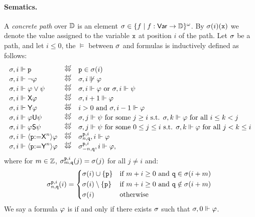\paragraph{Sematics.} A \emph{concrete path} over $\mathbb{D}$ is an element $\sigma\in\{f\mid f:{\rm \sf Var}\to\mathbb{D}\}^\omega$. By $\sigma(i)(\mathtt{x})$ we denote the value assigned to the variable $\mathtt{x}$ at position $i$ of the path.
Let $\sigma$ be a path, and let $i\leq 0$, the  $\models$ between $\sigma$ and formulas is inductively defined as follows:
\[
\begin{array}{lcl}
\apath,i \models \avarprop & \iffdef & \avarprop\in\apath(i) \\
\apath,i \models \neg\aformula & \iffdef & \apath,i \not\models\aformula \\
\apath,i \models \aformula\vee\aformulabis & \iffdef & \apath,i \models \aformula \mbox{ or } \apath,i \models \aformulabis \\
\apath,i \models \Next\aformula & \iffdef & \apath,i+1 \models \aformula \\ 
\apath,i \models \Prev\aformula & \iffdef & i>0 \mbox{ and } \apath,i-1 \models \aformula \\
\apath,i \models \aformula\Until\aformulabis & \iffdef & \apath,j \models \aformulabis \mbox{ for some } j\geq i \mbox{ s.t. } \apath,k \models \aformula \mbox{ for all } i\leq k < j \\
\apath,i \models \aformula\Since\aformulabis & \iffdef & \apath,j \models \aformulabis \mbox{ for some } 0\leq j \leq i \mbox{ s.t. } \apath,k \models \aformula \mbox{ for all } j< k \leq i \\
\apath,i \models \Assign{\avarprop}{\Nextn}\aformula & \iffdef & \apath^{\avarprop,i}_{n,\avarpropbis},i \models \aformula \\ 
\apath,i \models \Assign{\avarprop}{\Prevn}\aformula & \iffdef & \apath^{\avarprop,i}_{{-}n,\avarpropbis},i \models \aformula,
\end{array}
\]
where for $m\in\mathbb{Z}$, $\sigma^{\mathtt{p},i}_{m,\mathtt{q}}(j)=\sigma(j)$ for all $j\neq i$ and:
\begin{equation*}
    \apath^{\avarprop,i}_{n,\avarpropbis}(i) =
    \begin{cases*}
      \apath(i)\cup\{\avarprop\} & if $m+i \geq 0$ and $\avarpropbis\in\apath(i+m)$ \\
      \apath(i)\setminus\{\avarprop\} & if $m+i \geq 0$ and $\avarpropbis\notin\apath(i+m)$ \\ 
      \apath(i)        & otherwise
    \end{cases*}
\end{equation*}
We say a formula $\varphi$ is  if and only if there exists $\sigma$ such that $\sigma,0\Vdash\varphi$.



